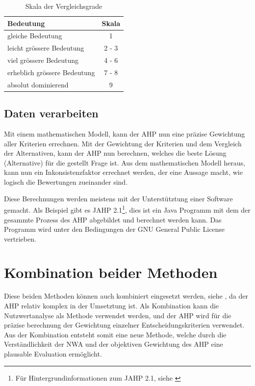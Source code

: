   \begin{table}[ht]
    \sffamily 
    \begin{center}
      \begin{tabular}{lc}
        \toprule
        Bedeutung & Skala\\
        \midrule
        gleiche Bedeutung & 1\\
        leicht grössere Bedeutung & 2 - 3\\
        viel grössere Bedeutung & 4 - 6\\
        erheblich grössere Bedeutung & 7 - 8\\
        absolut dominierend & 9\\
        \bottomrule
      \end{tabular}
      \caption{Skala der Vergleichsgrade}
      \label{tab:vergleichsgrade}
    \end{center}
  \end{table}
    
  \subsection{Daten verarbeiten}
  
  Mit einem mathematischen Modell, kann der \ac{AHP} nun eine präzise Gewichtung
  aller Kriterien errechnen. Mit der Gewichtung der Kriterien und dem Vergleich
  der Alternativen, kann der \ac{AHP} nun berechnen, welches die beste Lösung
  (Alternative) für die gestellt Frage ist. Aus dem mathematischen Modell
  heraus, kann nun ein Inkonsistenzfaktor errechnet werden, der eine Aussage
  macht, wie logisch die Bewertungen zueinander sind.
  
  Diese Berechnungen werden meistens mit der Unterstütztung einer Software
  gemacht. Als Beispiel gibt es JAHP 2.1\footnote{Für Hintergrundinformationen
  zum JAHP 2.1, siehe \cite{JAHP}}, dies ist ein Java Programm mit dem der
  gesammte Prozess des \ac{AHP} abgebildet und berechnet werden kann. Das
  Programm wird unter den Bedingungen der GNU General Public License
  vertrieben.
    
  \section{Kombination beider Methoden}
  
  Diese beiden Methoden können auch kombiniert eingesetzt werden, siehe
  \cite{AhpNwaKombination}, da der \ac{AHP} relativ komplex in der Umsetztung
  ist. Als Kombination kann die Nutzwertanalyse als Methode verwendet werden,
  und der \ac{AHP} wird für die präzise berechnung der Gewichtung einzelner
  Entscheidungskriterien verwendet. Aus der Kombination entsteht somit eine
  neue Methode, welche durch die Verständlichkeit der \ac{NWA} und der
  objektiven Gewichtung des \ac{AHP} eine plausable Evaluation ermöglicht.
  
